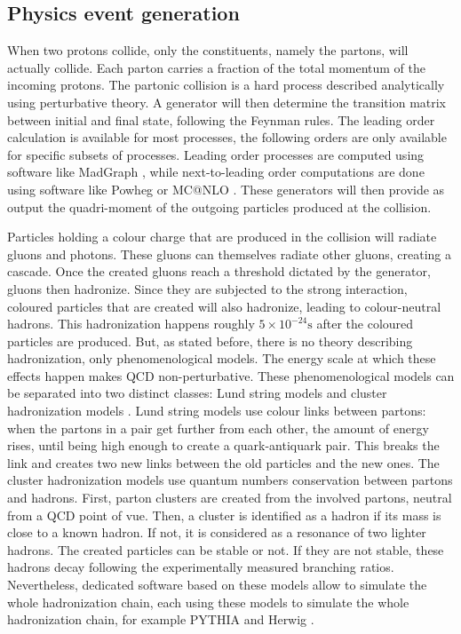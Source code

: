 \subsection{Physics event generation} 
\label{sec:cms_physics_event_generation}

When two protons collide, only the constituents, namely the partons, will actually collide. Each parton carries a fraction of the total momentum of the incoming protons. The partonic collision is a hard process described analytically using perturbative theory. A generator will then determine the transition matrix between initial and final state, following the Feynman rules. The leading order calculation is available for most processes, the following orders are only available for specific subsets of processes. Leading order processes are computed using software like MadGraph \cite{Alwall2011}, while next-to-leading order computations are done using software like Powheg \cite{Alioli2010} or MC@NLO \cite{Frixione_2002}.
These generators will then provide as output the quadri-moment of the outgoing particles produced at the collision.

Particles holding a colour charge that are produced in the collision will radiate gluons and photons. These gluons can themselves radiate other gluons, creating a cascade. Once the created gluons reach a threshold dictated by the generator, gluons then hadronize. Since they are subjected to the strong interaction, coloured particles that are created will also hadronize, leading to colour-neutral hadrons. This hadronization happens roughly $5 \times 10^{-24}\mathrm{s}$ after the coloured particles are produced. But, as stated before, there is no theory describing hadronization, only phenomenological models. The energy scale at which these effects happen makes QCD non-perturbative. These phenomenological models can be separated into two distinct classes: Lund string models \cite{1983PhR....97...31A} and cluster hadronization models \cite{Winter2004}. Lund string models use colour links between partons: when the partons in a pair get further from each other, the amount of energy rises, until being high enough to create a quark-antiquark pair. This breaks the link and creates two new links between the old particles and the new ones. The cluster hadronization models use quantum numbers conservation between partons and hadrons. First, parton clusters are created from the involved partons, neutral from a QCD point of vue. Then, a cluster is identified as a hadron if its mass is close to a known hadron. If not, it is considered as a resonance of two lighter hadrons. The created particles can be stable or not. If they are not stable, these hadrons decay following the experimentally measured branching ratios. Nevertheless, dedicated software based on these models allow to simulate the whole hadronization chain, each using these models to simulate the whole hadronization chain, for example PYTHIA \cite{SJOSTRAND2008852} and Herwig \cite{Bellm2016}.

